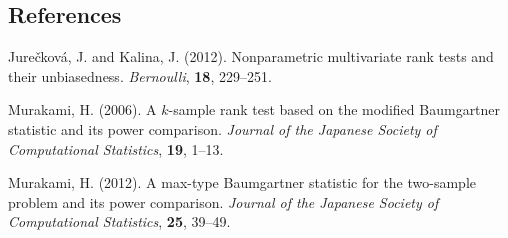 \documentclass[12pt]{article}
\begin{document}
%        
%
%        

\subsection*{References}

\begin{description}
\item Jure\v{c}kov\'{a}, J. and Kalina, J. (2012). 
Nonparametric multivariate rank tests and their unbiasedness. 
{\textit{Bernoulli}}, \textbf{18}, 229--251.

\item Murakami, H. (2006). 
A $k$-sample rank test based on the modified Baumgartner statistic and its power comparison. 
{\textit{Journal of the Japanese Society of Computational Statistics}}, {\textbf{19}}, 1--13.

\item Murakami, H. (2012). 
A max-type Baumgartner statistic for the two-sample problem and its power comparison. 
{\textit{Journal of the Japanese Society of Computational Statistics}}, \textbf{25}, 39--49.



\end{description}
\end{document}
